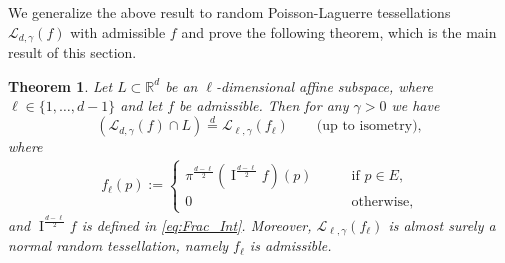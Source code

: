 \documentclass[11pt,a4paper]{article}
\theoremstyle{plain}
\newtheorem{theorem}{Theorem}[section]
\theoremstyle{definition}
\theoremstyle{remark}
\def\RR{\mathbb{R}}
\def\cL{\mathcal{L}}
\newcommand{\frI}{\mathop{\mathrm{I}}\nolimits}
\begin{document}
We generalize the above result to random Poisson-Laguerre tessellations $\cL_{d,\gamma}(f)$ with admissible $f$ and prove the following theorem, which is the main result of this section.

\begin{theorem} \label{thm:sectional}
    Let $L\subset \RR^d$ be an $\ell$-dimensional affine subspace, where $\ell \in \{1,\dots,d-1\}$ and let $f$ be admissible. Then for any $\gamma>0$ we have
    \[
        (\cL_{d,\gamma}(f) \cap L)\overset{d}{=}\cL_{\ell,\gamma}(f_{\ell})\qquad \text{(up to isometry)},
    \]
    where
    \begin{align*}
        f_{\ell}(p):= 
        \begin{cases}
            \pi^{\frac{d-\ell}{2}}(\frI^{\frac{d-\ell}{2}}f)(p)\qquad &\text{if }p\in E,\\ 
            0 &\text{otherwise},
        \end{cases}
    \end{align*}
    and $\frI^{\frac{d-\ell}{2}}f$ is defined in \eqref{eq:Frac_Int}. Moreover, $\cL_{\ell,\gamma}(f_{\ell})$ is almost surely a normal random tessellation, namely $f_{\ell}$ is admissible.
     
\end{theorem}
\end{document}
